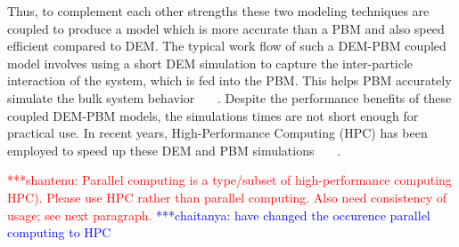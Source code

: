 \documentclass[preprint,11pt,authoryear]{elsarticle}
\newcommand{\jhanote}[1]{ {\textcolor{red} { ***shantenu: #1 }}}
\newcommand{\csnote}[1]{ {\textcolor{blue} { ***chaitanya: #1 }}}
\newcommand{\gpnote}[1]{{\textcolor{green} {***giannis: #1}}}
\newcommand{\jhanote}[1]{}
\newcommand{\csnote}[1]{}
\newcommand{\gpnote}[1]{}
\begin{document}
Thus, to complement each other strengths these two modeling techniques are 
coupled to produce a model which is more accurate than a PBM and also speed  
efficient compared to DEM. The typical work flow of such a
DEM-PBM coupled model involves using a short DEM simulation to capture the
inter-particle interaction of the system, which is fed into the PBM. This helps 
PBM accurately simulate the bulk system behavior~\citep{Goldschmidt2003}
~\citep{Reinhold2012}~\citep{Barrasso2013}. Despite the performance benefits of
these coupled DEM-PBM models, the simulations times are not short enough for 
practical use. In recent years, High-Performance Computing (HPC) has 
been employed to speed up  these DEM and PBM simulations
~\citep{Gunawan2008}~\citep{Prakash2013a}~\citep{Bettencourt2017}.

\jhanote{Parallel computing is a type/subset of high-performance computing
HPC). Please use HPC rather than parallel computing. Also need consistency of
usage; see next paragraph.} \csnote{have changed the occurence parallel computing to HPC}




\end{document}

